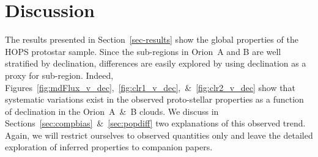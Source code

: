 \documentclass[manuscript]{aastex}
\begin{document}
\section{Discussion}
\label{sec:discussion}
\par
The results presented in Section~\ref{sec-results} show the global properties of the HOPS protostar sample.  Since the sub-regions in Orion~A and B are well stratified by declination, differences are easily explored by using declination as a proxy for sub-region.   Indeed, Figures~\ref{fig:mdFlux_v_dec},~\ref{fig:clr1_v_dec},~\&~\ref{fig:clr2_v_dec} show that systematic variations exist in the observed proto-stellar properties as a function of declination in the Orion~A~\&~B clouds.  We discuss in Sections~\ref{sec:compbias}~\&~\ref{sec:popdiff} two explanations of this observed trend.   Again, we will restrict ourselves to observed quantities only and leave the detailed exploration of inferred properties to companion papers.
\end{document}
